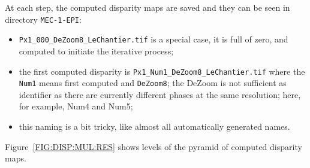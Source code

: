 At each step, the computed disparity maps are saved and they  can be seen  in
directory {\tt MEC-1-EPI}:

\begin{itemize}
   \item {\tt Px1\_000\_DeZoom8\_LeChantier.tif} is a special case, it is
        full of zero, and computed to initiate the iterative process;


   \item the first computed disparity is {\tt Px1\_Num1\_DeZoom8\_LeChantier.tif} where
          the {\tt Num1} means first computed and {\tt DeZoom8}; the DeZoom is
          not sufficient as identifier as there are currently different phases at the
           same resolution; here, for example, Num4 and Num5;

   \item this naming is a bit tricky, like almost all automatically generated names.

\end{itemize}

Figure~\ref{FIG:DISP:MUL:RES} shows levels of the pyramid of computed disparity maps.

